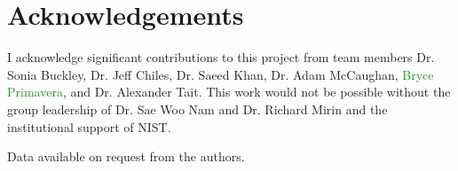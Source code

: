 \documentclass[twocolumn]{article}
\begin{document}
\section{\label{sec:acknowledgements}Acknowledgements}
I acknowledge significant contributions to this project from team members Dr. Sonia Buckley, Dr. Jeff Chiles, Dr. Saeed Khan, Dr. Adam McCaughan, \textcolor{ForestGreen}{Bryce Primavera}, and Dr. Alexander Tait. This work would not be possible without the group leadership of Dr. Sae Woo Nam and Dr. Richard Mirin and the institutional support of NIST.

\vspace{2em}
Data available on request from the authors.



\end{document}

